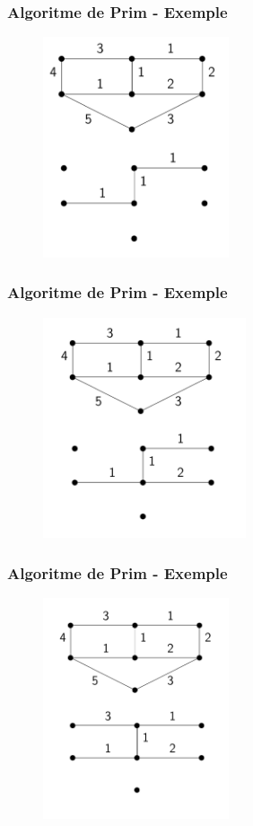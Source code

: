 \documentclass{beamer}
\begin{document}
\begin{frame}
\frametitle{Algoritme de Prim - Exemple}
\begin{figure}[h]
 \label{fig:volum}
\centering
\includegraphics[height=6.5cm]{prim4}
\end{figure}
\end{frame}

\begin{frame}
\frametitle{Algoritme de Prim - Exemple}
\begin{figure}[h]
 \label{fig:volum}
\centering
\includegraphics[height=6.5cm]{prim5}
\end{figure}
\end{frame}

\begin{frame}
\frametitle{Algoritme de Prim - Exemple}
\begin{figure}[h]
 \label{fig:volum}
\centering
\includegraphics[height=6.5cm]{prim6}
\end{figure}
\end{frame}
\end{document}
